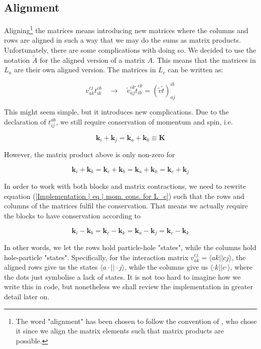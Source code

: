\documentclass[10pt,twoside]{report}
\begin{document}
	\subsection{Alignment}
	Aligning\footnote{The word "alignment" has been chosen to follow the convention of \cite{Hansen15}, who chose it since we align the matrix elements such that matrix products are possible.} the matrices means introducing new matrices where the columns and rows are aligned in such a way that we may do the sums as matrix products. Unfortunately, there are some complications with doing so. We decided to use the notation $\tilde{A}$ for the aligned version of a matrix $A$. This means that the matrices in $L_a$ are their own aligned version. The matrices in $L_c$ can be written as:
	
	\begin{equation}
		v_{ak}^{cj}t_{ik}^{cb} \quad\rightarrow\quad \tilde{v}_{aj}^{ck}\tilde{t}_{ib}^{ck} = \left(\tilde{v}\tilde{t}\right)_{aj}^{ib}
	\end{equation}
	
	This might seem simple, but it introduces new complications. Due to the declaration of $t_{ij}^{ab}$, we still require conservation of momentum and spin, i.e.
	
	\begin{equation}
		\bm{k}_i + \bm{k}_j = \bm{k}_a + \bm{k}_b \equiv \bm{K}
	\end{equation}
	
	However, the matrix product above is only non-zero for
	
	\begin{equation}
		\bm{k}_i + \bm{k}_k = \bm{k}_c + \bm{k}_b = \bm{k}_a + \bm{k}_k = \bm{k}_c + \bm{k}_j
		\label{Implementation | eq | mom. cons. for L_c}
	\end{equation}
	
	In order to work with both blocks and matrix contractions, we need to rewrite equation (\ref{Implementation | eq | mom. cons. for L_c}) such that the rows and columns of the matrices fulfil the conservation. That means we actually require the blocks to have conservation according to
	
	\begin{equation}
	\bm{k}_i - \bm{k}_b = \bm{k}_c - \bm{k}_k = \bm{k}_a - \bm{k}_j = \bm{k}_c - \bm{k}_k
	\label{Implementation | eq | mom. cons. for L_c, aligned}
	\end{equation}
	
	In other words, we let the rows hold particle-hole "states", while the columns hold hole-particle "states". Specifically, for the interaction matrix $v_{ak}^{cj}=\langle ak||cj\rangle$, the aligned rows give us the states $\langle a\cdot||\cdot j\rangle$, while the columns give us $\langle \cdot k||c\cdot\rangle$, where the dots just symbolise a lack of states. It is not too hard to imagine how we write this in code, but nonetheless we shall review the implementation in greater detail later on.\\
	
\end{document}
